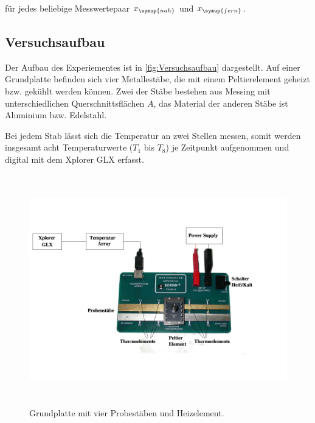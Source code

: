 für jedes beliebige Messwertepaar $x_{\symup{nah}}$ und $x_{\symup{fern}}$. \cite{v204}

\subsection{Versuchsaufbau}
\label{sec:Versuchsaufbau}

Der Aufbau des Experiementes ist in \autoref{fig:Versuchsaufbau} dargestellt.
Auf einer Grundplatte befinden sich vier Metallestäbe, die mit einem Peltierelement geheizt bzw. gekühlt werden können.
Zwei der Stäbe bestehen aus Messing mit unterschiedlichen Querschnittsflächen $A$, das Material der anderen Stäbe ist
Aluminium bzw. Edelstahl.

Bei jedem Stab lässt sich die Temperatur an zwei Stellen messen, somit werden insgesamt acht Temperaturwerte ($T_{1}$ bis $T_{8}$) je
Zeitpunkt aufgenommen und digital mit dem \glqq Xplorer GLX\grqq{} erfasst.

\begin{figure} [H]
    \centering
    \includegraphics[height=10cm]{content/Abbildungen/Versuchsaufbau.pdf}
    \caption{Grundplatte mit vier Probestäben und Heizelement.\cite{v204}}
    \label{fig:Versuchsaufbau}
\end{figure}
